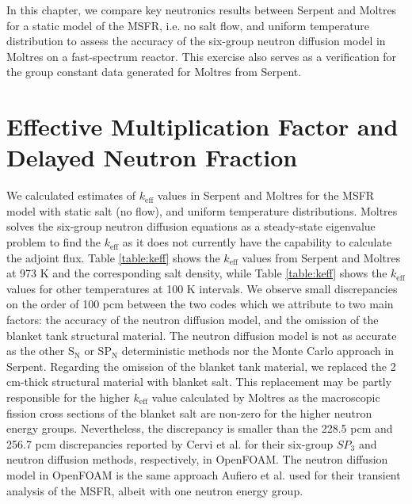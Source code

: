 In this chapter, we compare key neutronics results between Serpent and Moltres
for a static model of the \gls{MSFR}, i.e. no salt flow, and uniform
temperature distribution to assess the accuracy of the
six-group neutron diffusion model in Moltres on a fast-spectrum reactor. This
exercise also serves as a verification for the group constant data
generated for Moltres from Serpent.

\section{Effective Multiplication Factor and Delayed Neutron Fraction}

We calculated estimates of $k_{\text{eff}}$ values in Serpent and Moltres for
the \gls{MSFR} model with static salt (no flow), and uniform temperature
distributions. Moltres solves the six-group neutron diffusion equations as a
steady-state eigenvalue problem to find the $k_{\text{eff}}$ as it does not
currently have the capability to calculate the adjoint flux. Table
\ref{table:keff} shows the $k_{\text{eff}}$ values from Serpent and Moltres at
973 K and the corresponding salt density, while Table \ref{table:keff} shows
the $k_{\text{eff}}$ values for other temperatures at 100 K intervals. We
observe small discrepancies on the order of 100 pcm between the two codes
which we attribute to two main factors: the accuracy of the neutron diffusion
model, and the omission of the blanket tank structural material. The neutron
diffusion model is not as accurate as the other S$_{\text{N}}$ or
SP$_{\text{N}}$ deterministic methods nor the Monte Carlo approach in Serpent.
Regarding the omission of the blanket tank material, we replaced the
2 cm-thick structural material with blanket salt. This replacement may be
partly responsible for the higher $k_{\text{eff}}$ value calculated by Moltres
as the macroscopic fission cross sections of the blanket salt are non-zero for
the higher neutron energy groups. Nevertheless, the discrepancy is smaller
than the 228.5 pcm and 256.7 pcm discrepancies reported by Cervi et al.
\cite{cervi_development_2019} for their six-group $SP_3$ and neutron
diffusion methods, respectively, in OpenFOAM. The neutron diffusion model in
OpenFOAM is the same approach Aufiero et al. \cite{aufiero_development_2014}
used for their transient analysis of the \gls{MSFR}, albeit with one neutron
energy group.

